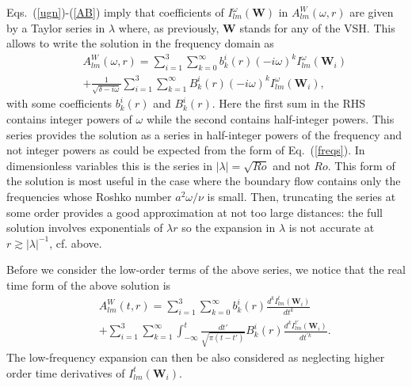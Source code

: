 \documentclass[aps,prx,twocolumn,amsmath,amssymb,amsfonts]{revtex4-2}
\begin{document}
Eqs.~(\ref{ugn})-(\ref{AB}) imply that coefficients of $I_{lm}^{\omega}(\bm W)$ in $A_{lm}^{W}(\omega, r)$ are given by a Taylor series in $\lambda$ where, as previously, $\bm W$ stands for any of the VSH. This allows to write the solution in the frequency domain as
\begin{eqnarray}&&
A_{lm}^{W}(\omega, r)\! = \!\sum_{i=1}^3\sum_{k=0}^{\infty} b_k^i(r)(-i\omega)^k I_{lm}^{\omega}(\bm W_i)
\nonumber\\&&
+\frac{1}{\sqrt{\delta-i\omega}}\sum_{i=1}^3\sum_{k=1}^{\infty} B_k^i(r)(-i\omega)^k I_{lm}^{\omega}(\bm W_i), \label{frs}
\end{eqnarray}
with some coefficients $b_k^i(r)$ and $B_k^i(r)$. Here the first sum in the RHS contains integer powers of $\omega$ while the second contains half-integer powers. This series provides the solution as a series in half-integer powers of the frequency and not integer powers as could be expected from the form of Eq.~(\ref{freqs}). In dimensionless variables this is the series in $|\lambda|=\sqrt{Ro}$ and not $Ro$. This form of the solution is most useful in the case where the boundary flow contains only the frequencies whose Roshko number $a^2\omega/\nu$ is small. Then, truncating the series at some order provides a good approximation at not too large distances: the full solution involves exponentials of $\lambda r$ so the expansion in $\lambda$ is not accurate at $r\gtrsim |\lambda|^{-1}$, cf. above.

Before we consider the low-order terms of the above series, we notice that the real time form of the above solution is
\begin{eqnarray}&&
A_{lm}^{W}(t, r)\! = \!\sum_{i=1}^3\sum_{k=0}^{\infty} b_k^i(r)\frac{d^k I_{lm}^{t}(\bm W_i)}{dt^k}
\nonumber\\&&
+\sum_{i=1}^3\sum_{k=1}^{\infty} \int_{-\infty}^t \frac{dt'}{\sqrt{\pi(t-t')}} B_k^i(r)\frac{d^k I_{lm}^{t'}(\bm W_i)}{dt^{'k}}.  \label{fdo}
\end{eqnarray}
The low-frequency expansion can then be also considered as neglecting higher order time derivatives of $I_{lm}^{t}(\bm W_i)$.
\end{document}
